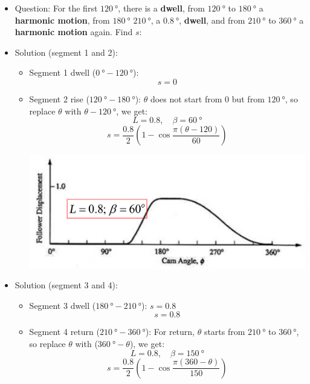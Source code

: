 \documentclass[11pt]{article}
\begin{document}
\begin{itemize}
\item Question:
For the first \(\qty{120}{\degree}\), there is a \textbf{dwell}, from \(\qty{120}{\degree}\) to \(\qty{180}{\degree}\) a \textbf{harmonic motion}, from \(\qty{180}{\degree}\) \(\qty{210}{\degree}\), a \(\qty{0.8}{\degree}\), \textbf{dwell}, and from \(\qty{210}{\degree}\) to \(\qty{360}{\degree}\) a \textbf{harmonic motion} again. Find \(s\):

\item Solution (segment 1 and 2):
\begin{itemize}
\item Segment 1 dwell (\(\qty{0}{\degree} - \qty{120}{\degree}\)):
\[s = 0\]
\item Segment 2 rise (\(\qty{120}{\degree} - \qty{180}{\degree}\)): \(\theta\) does not start from 0 but from \(\qty{120}{\degree}\), so replace \(\theta\) with \(\theta - \qty{120}{\degree}\), we get:
\[L = 0.8, \quad \beta = \qty{60}{\degree}\]
\[s = \frac{0.8}{2} \left(1 - \cos \frac{\pi (\theta - 120)}{60} \right)\]

\begin{center}
\includegraphics[width=.9\linewidth]{./images/harmonic-motion-example-segment-1-and-2.png}
\end{center}

 \newpage
\end{itemize}

\item Solution (segment 3 and 4):
\begin{itemize}
\item Segment 3 dwell (\(\qty{180}{\degree} - \qty{210}{\degree}\)): \(s = 0.8\)
\[s = 0.8\]
\item Segment 4 return (\(\qty{210}{\degree} - \qty{360}{\degree}\)):
For return, \(\theta\) starts from \(\qty{210}{\degree}\) to \(\qty{360}{\degree}\), so replace \(\theta\) with (\(\qty{360}{\degree} - \theta\)), we get:
\[L = 0.8, \quad \beta = \qty{150}{\degree}\]
\[s = \frac{0.8}{2} \left(1 - \cos \frac{\pi (360 - \theta)}{150} \right)\]


\end{itemize}
\end{itemize}
\end{document}
